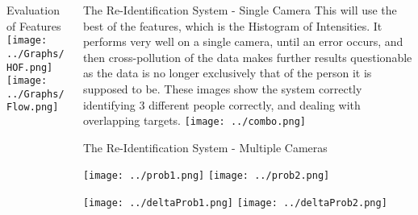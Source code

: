 \documentclass[final]{beamer}
\begin{document}
\begin{frame}{}
\begin{columns}[t]
\begin{column}{.49\linewidth}
\begin{block}{Evaluation of Features}
		\hspace{1cm}
		\texttt{[image: ../Graphs/HOF.png]}
		\hspace{2cm}
		\texttt{[image: ../Graphs/Flow.png]}
		
        \end{block}
	 \end{column}
	 \begin{column}{.49\linewidth}
 		\begin{block}{The Re-Identification System - Single Camera}
 		This will use the best of the features, which is the Histogram of Intensities. It performs very well on a single camera, until an error occurs, and then cross-pollution of the data makes further results questionable as the data is no longer exclusively that of the person it is supposed to be. 
 		These images show the system correctly identifying 3 different people correctly, and dealing with overlapping targets. 
 		\texttt{[image: ../combo.png]}  
         
        \end{block}
        
        \begin{block}{The Re-Identification System - Multiple Cameras}
 		 
 		\texttt{[image: ../prob1.png]}  
 		\hspace{.8cm}
        \texttt{[image: ../prob2.png]}  
        
        \texttt{[image: ../deltaProb1.png]}
        \hspace{.8cm}
        \texttt{[image: ../deltaProb2.png]}  
        \end{block}

      \end{column}
    \end{columns}
    

  \end{frame}
\end{document}
